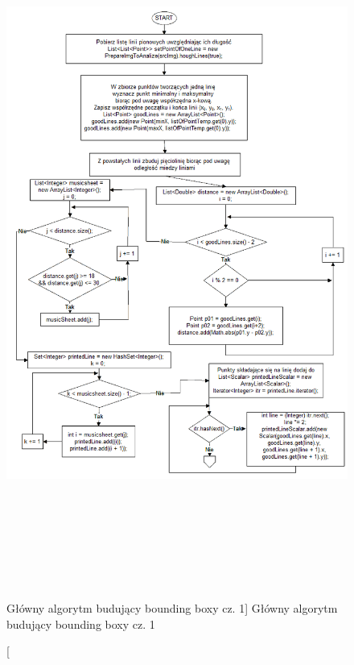 \documentclass[a4paper,12pt]{article}
\begin{document}
			\begin{figure}[!ht]  
			    \begin{center}
				    \includegraphics[height=22.5cm]{image//algorithm//majorProcesing_01.png} 
			    \end{center}
			    \caption
    			    [Główny algorytm budujący bounding boxy cz. 1]  
    			    {Główny algorytm budujący bounding boxy cz. 1}  
		    \end{figure}
			
			\newpage
			
\end{document}
